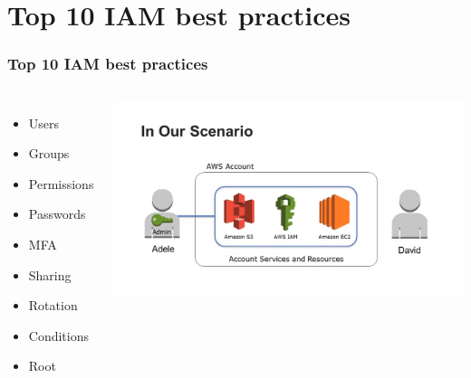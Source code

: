 \documentclass{beamer}
\begin{document}
\section{Top 10 IAM best practices}
\begin{frame}[fragile]
\frametitle{Top 10 IAM best practices}
\begin{columns}
\begin{itemize}
 \item Users
 \item Groups
 \item Permissions
 \item Passwords
 \item MFA
 \item Sharing
 \item Rotation
 \item Conditions
 \item Root
\end{itemize}
 \includegraphics[width= 1.0 \textwidth]{scenario.png}
\end{columns}
\end{frame}
\end{document}
